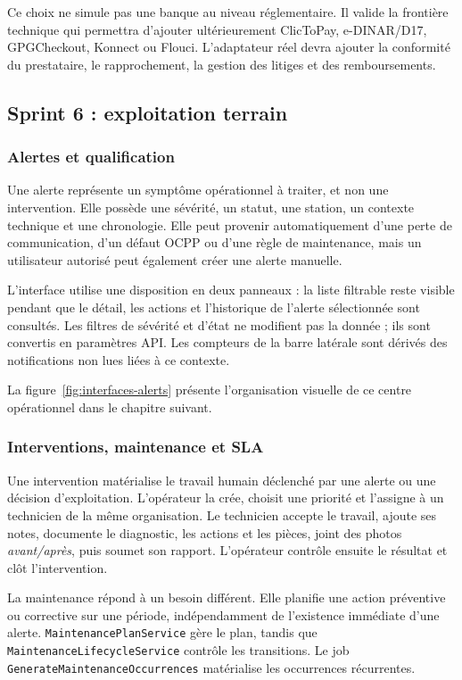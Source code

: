 Ce choix ne simule pas une banque au niveau réglementaire. Il valide la frontière
technique qui permettra d'ajouter ultérieurement ClicToPay, e-DINAR/D17,
GPGCheckout, Konnect ou Flouci. L'adaptateur réel devra ajouter la conformité du
prestataire, le rapprochement, la gestion des litiges et des remboursements.

\subsection{Sprint 6 : exploitation terrain}

\subsubsection{Alertes et qualification}

Une alerte représente un symptôme opérationnel à traiter, et non une intervention.
Elle possède une sévérité, un statut, une station, un contexte technique et une
chronologie. Elle peut provenir automatiquement d'une perte de communication,
d'un défaut OCPP ou d'une règle de maintenance, mais un utilisateur autorisé peut
également créer une alerte manuelle.

L'interface utilise une disposition en deux panneaux : la liste filtrable reste
visible pendant que le détail, les actions et l'historique de l'alerte sélectionnée
sont consultés. Les filtres de sévérité et d'état ne modifient pas la donnée ; ils
sont convertis en paramètres API. Les compteurs de la barre latérale sont dérivés
des notifications non lues liées à ce contexte.

La figure~\ref{fig:interfaces-alerts} présente l'organisation visuelle de ce
centre opérationnel dans le chapitre suivant.

\subsubsection{Interventions, maintenance et SLA}

Une intervention matérialise le travail humain déclenché par une alerte ou une
décision d'exploitation. L'opérateur la crée, choisit une priorité et l'assigne à
un technicien de la même organisation. Le technicien accepte le travail, ajoute
ses notes, documente le diagnostic, les actions et les pièces, joint des photos
\emph{avant/après}, puis soumet son rapport. L'opérateur contrôle ensuite le
résultat et clôt l'intervention.

La maintenance répond à un besoin différent. Elle planifie une action préventive
ou corrective sur une période, indépendamment de l'existence immédiate d'une
alerte. \texttt{MaintenancePlanService} gère le plan, tandis que
\texttt{MaintenanceLifecycleService} contrôle les transitions. Le job
\texttt{GenerateMaintenanceOccurrences} matérialise les occurrences récurrentes.

